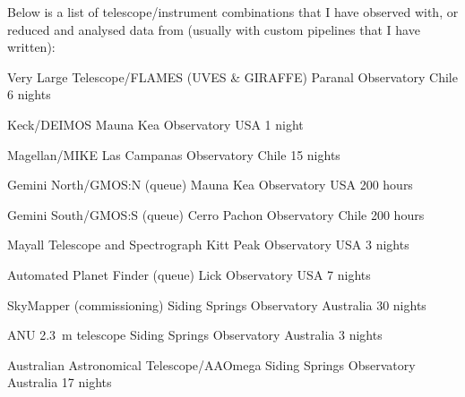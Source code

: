 
Below is a list of telescope/instrument combinations that I have observed with, or reduced and analysed data from (usually with custom pipelines that I have written):

\begin{cvhonors}


  \cvhonor
    {Very Large Telescope/FLAMES (UVES \& GIRAFFE)}
    {Paranal Observatory}
    {Chile}
    {6 nights}
 
   \cvhonor
   	{Keck/DEIMOS}
	{Mauna Kea Observatory}
	{USA}
	{1 night}

   \cvhonor
   	{Magellan/MIKE}
	{Las Campanas Observatory}
	{Chile}
	{15 nights}

   \cvhonor
   	{Gemini North/GMOS:N (queue)}
	{Mauna Kea Observatory}
	{USA}
	{200 hours}

   \cvhonor
   	{Gemini South/GMOS:S (queue)}
	{Cerro Pachon Observatory}
	{Chile}
	{200 hours}

    \cvhonor
   	{Mayall Telescope and Spectrograph}
	{Kitt Peak Observatory}
	{USA}
	{3 nights}

    \cvhonor
   	{Automated Planet Finder (queue)}
	{Lick Observatory}
	{USA}
	{7 nights}

    \cvhonor
   	{SkyMapper (commissioning)}
	{Siding Springs Observatory}
	{Australia}
	{30 nights}

    \cvhonor
   	{ANU 2.3~m telescope}
	{Siding Springs Observatory}
	{Australia}
	{3 nights}

    \cvhonor
   	{Australian Astronomical Telescope/AAOmega}
	{Siding Springs Observatory}
	{Australia}
	{17 nights}
	
\end{cvhonors}
